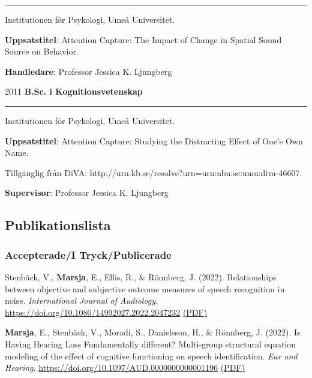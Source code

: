 \documentclass[]{article}
\begin{document}
\hrule
\begin{changemargin}{2.3cm}{2.4cm}

Institutionen för Psykologi, Umeå Universitet.

\textbf{Uppsatstitel}: Attention Capture: The Impact of Change in Spatial Sound Source on Behavior. 
    
\textbf{Handledare}: Professor Jessica K. Ljungberg
\end{changemargin}

2011 \hspace{1.5cm}\textbf{B.Sc. i Kognitionsvetenskap}\vspace{1mm}

\hrule

\begin{changemargin}{2.3cm}{2.4cm}

Institutionen för Psykologi, Umeå Universitet.

\textbf{Uppsatstitel}:  Attention Capture: Studying the Distracting Effect of One’s Own Name.

Tillgänglig från DiVA: \sloppy http://urn.kb.se/resolve?urn=urn:nbn:se:umu:diva-46607.
    
\textbf{Supervisor}: Professor Jessica K. Ljungberg
\end{changemargin}

\hypertarget{publikationslista}{%
\subsection{Publikationslista}\label{publikationslista}}

\hypertarget{accepteradei-tryckpublicerade}{%
\subsubsection{Accepterade/I
Tryck/Publicerade}\label{accepteradei-tryckpublicerade}}

Stenbäck, V., \textbf{Marsja}, E., Ellis, R., \& Rönnberg, J. (2022).
Relationships between objective and subjective outcome measures of
speech recognition in noise. \emph{International Journal of Audiology}.
\url{https://doi.org/10.1080/14992027.2022.2047232}
\href{https://bit.ly/IJA2022}{(PDF)}

\textbf{Marsja}, E., Stenbäck, V., Moradi, S., Danielsson, H., \&
Rönnberg, J. (2022). Is Having Hearing Loss Fundamentally different?
Multi-group structural equation modeling of the effect of cognitive
functioning on speech identification. \emph{Ear and Hearing}.
\url{https://doi.org/10.1097/AUD.0000000000001196}
\href{https://bit.ly/EANDH22}{(PDF)}
\end{document}
